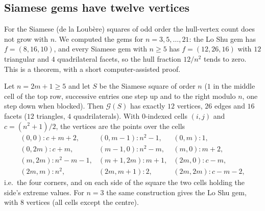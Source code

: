 \subsection{Siamese gems have twelve vertices}
\label{sec:siamese-gems}

For the Siamese (de la Loub\`ere) squares of odd order the hull-vertex count
does not grow with $n$.  We computed the gems for $n=3,5,\dots,21$: the Lo Shu
gem has $f=(8,16,10)$, and every Siamese gem with $n\ge5$ has
$f=(12,26,16)$ with $12$ triangular and $4$ quadrilateral facets, so the hull
fraction $12/n^2$ tends to zero.  This is a
theorem, with a short computer-assisted proof.

\begin{proposition}
\label{prop:siamese-12}
Let $n=2m+1\ge5$ and let $S$ be the Siamese square of order $n$ ($1$ in the
middle cell of the top row, successive entries one step up and to the right
modulo $n$, one step down when blocked).  Then $\mathcal G(S)$ has exactly $12$
vertices, $26$ edges and $16$ facets ($12$ triangles, $4$ quadrilaterals).
With $0$-indexed cells $(i,j)$ and $c=(n^2+1)/2$, the vertices are the
points over the cells
\[
\begin{array}{lll}
(0,0)\colon c+m+2, & (0,m-1)\colon n^2-1, & (0,m)\colon 1, \\
(0,2m)\colon c+m, & (m-1,0)\colon n^2-m, & (m,0)\colon m+2, \\
(m,2m)\colon n^2-m-1, & (m+1,2m)\colon m+1, & (2m,0)\colon c-m, \\
(2m,m)\colon n^2, & (2m,m+1)\colon 2, & (2m,2m)\colon c-m-2,
\end{array}
\]
i.e.\ the four corners, and on each side of the square the two cells holding
the side's extreme values.  For $n=3$ the same construction gives the Lo Shu
gem, with $8$ vertices (all cells except the centre).
\end{proposition}

